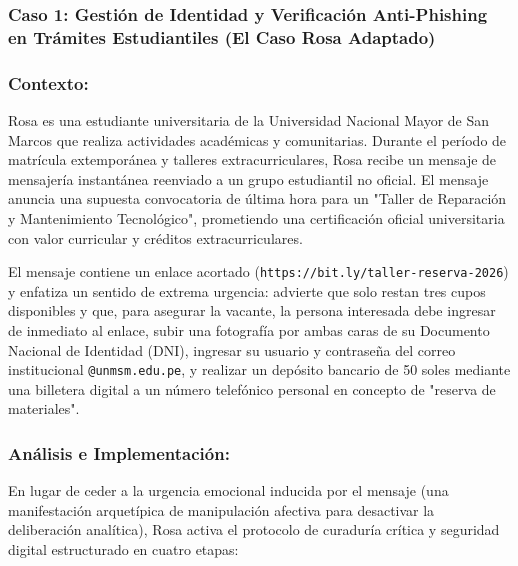 \subsubsection{Caso 1: Gestión de Identidad y Verificación Anti-Phishing en Trámites Estudiantiles (El Caso Rosa Adaptado)}

\subsubsection*{Contexto:}
Rosa es una estudiante universitaria de la Universidad Nacional Mayor de San Marcos que realiza actividades académicas y comunitarias. Durante el período de matrícula extemporánea y talleres extracurriculares, Rosa recibe un mensaje de mensajería instantánea reenviado a un grupo estudiantil no oficial. El mensaje anuncia una supuesta convocatoria de última hora para un "Taller de Reparación y Mantenimiento Tecnológico", prometiendo una certificación oficial universitaria con valor curricular y créditos extracurriculares.

El mensaje contiene un enlace acortado (\texttt{https://bit.ly/taller-reserva-2026}) y enfatiza un sentido de extrema urgencia: advierte que solo restan tres cupos disponibles y que, para asegurar la vacante, la persona interesada debe ingresar de inmediato al enlace, subir una fotografía por ambas caras de su Documento Nacional de Identidad (DNI), ingresar su usuario y contraseña del correo institucional \texttt{@unmsm.edu.pe}, y realizar un depósito bancario de 50 soles mediante una billetera digital a un número telefónico personal en concepto de "reserva de materiales".

\subsubsection*{Análisis e Implementación:}
En lugar de ceder a la urgencia emocional inducida por el mensaje (una manifestación arquetípica de manipulación afectiva para desactivar la deliberación analítica), Rosa activa el protocolo de curaduría crítica y seguridad digital estructurado en cuatro etapas:

